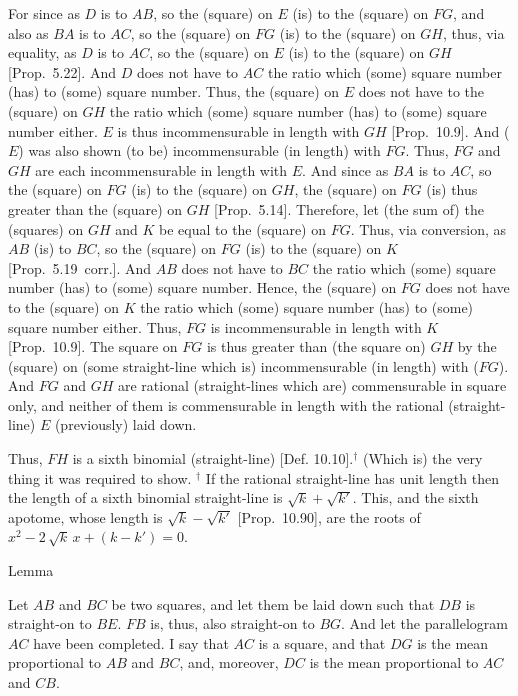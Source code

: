 For since as $D$ is to $AB$, so the (square) on $E$ (is) to the (square) on
$FG$, and also as $BA$ is to $AC$, so the (square) on $FG$ (is) to
the (square) on $GH$, thus, via equality, as $D$ is to $AC$, so
the (square) on $E$ (is) to the (square) on $GH$ [Prop.~5.22]. And $D$ does not have to $AC$ the
ratio which (some) square number (has) to (some) square number.  Thus, 
the (square) on $E$ does not have to the (square) on $GH$ the ratio
which (some) square number (has) to (some) square number either. $E$
is thus incommensurable in length with $GH$ [Prop.~10.9]. And ($E$) was also shown (to be)
incommensurable (in length) with $FG$.  Thus,  $FG$ and $GH$ are
each incommensurable in length with $E$. And since as $BA$ is to $AC$, 
so the (square) on $FG$ (is) to the (square) on $GH$, the (square) on $FG$ (is) thus greater than the (square) on $GH$ [Prop.~5.14]. Therefore, let (the sum of) the
(squares) on $GH$ and $K$ be equal to the (square) on $FG$. Thus,
via conversion, as $AB$ (is) to $BC$,
 so the (square) on $FG$ (is) to the
(square) on $K$ [Prop.~5.19~corr.].  And $AB$ does not
have to $BC$ the ratio which (some) square number (has) to (some) square number. Hence, the (square) on $FG$ does not have to the (square) on
$K$ the ratio which (some) square number (has) to (some) square number either. Thus, $FG$ is incommensurable in length with $K$ [Prop.~10.9]. The square on $FG$ is thus
greater than (the square on) $GH$ by the (square) on (some straight-line which is) incommensurable (in length) with ($FG$). And  $FG$ and $GH$ are rational
(straight-lines which are) commensurable in square only, and neither of them
is commensurable in length with the  rational (straight-line) $E$ (previously)
laid down.

Thus, $FH$ is a  sixth binomial (straight-line) [Def. 10.10].$^\dag$ (Which is) the very thing it was required to show.
{\footnotesize\noindent$^\dag$ If the rational straight-line has unit length then the length of a sixth binomial straight-line
is  $\sqrt{k}+\sqrt{k'}$. This, and the sixth apotome,
whose length is $\sqrt{k}-\sqrt{k'}$ [Prop.~10.90],
are the roots of $x^2- 2\,\sqrt{k}\,x+(k-k')=0$.}


\begin{center}
{\large Lemma}
\end{center}

Let $AB$ and $BC$ be two squares, and let them
be laid down such that $DB$ is straight-on to $BE$. $FB$ is, thus, also
straight-on to $BG$. And let the parallelogram $AC$ have been completed.
I say that $AC$ is a square, and that $DG$ is  the mean proportional to $AB$ and
$BC$, and, moreover,  $DC$ is the mean proportional to $AC$ and $CB$.

